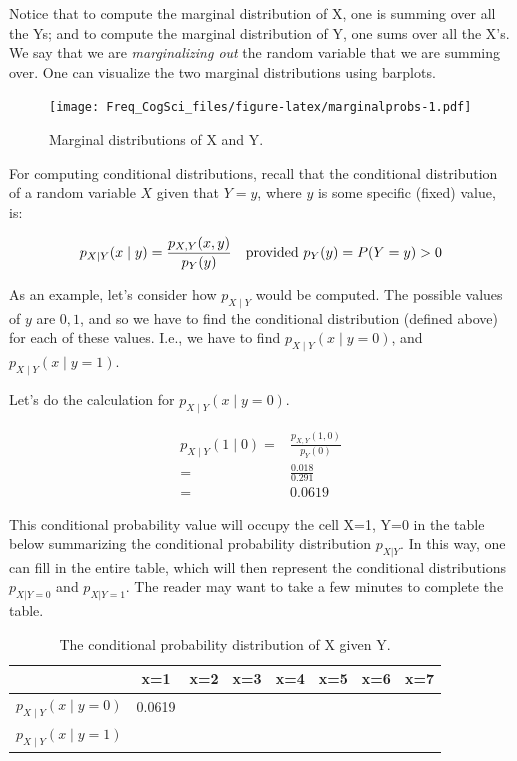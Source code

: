 \documentclass[12pt,]{krantz}
\begin{document}
Notice that to compute the marginal distribution of X, one is summing over all the Ys; and to compute the marginal distribution of Y, one sums over all the X's. We say that we are \emph{marginalizing out} the random variable that we are summing over. One can visualize the two marginal distributions using barplots.

\begin{figure}
\centering
\texttt{[image: Freq\_CogSci\_files/figure-latex/marginalprobs-1.pdf]}
\caption{\label{fig:marginalprobs}Marginal distributions of X and Y.}
\end{figure}

For computing conditional distributions, recall that the conditional distribution of a random variable \(X\) given that \(Y=y\), where \(y\) is some specific (fixed) value, is:

\begin{equation}
p_{X\mid Y} (x\mid y) = \frac{p_{X,Y}(x,y)}{p_Y(y)} \quad \hbox{provided } p_Y(y)=P(Y=y)>0
\end{equation}

As an example, let's consider how \(p_{X\mid Y}\) would be computed.
The possible values of \(y\) are \(0,1\), and so we have to find the conditional distribution (defined above) for each of these values. I.e., we have to find \(p_{X\mid Y}(x\mid y=0)\), and \(p_{X\mid Y}(x\mid y=1)\).

Let's do the calculation for \(p_{X\mid Y}(x\mid y=0)\).

\begin{equation}
\begin{split}
p_{X\mid Y} (1\mid 0) =& \frac{p_{X,Y}(1,0)}{p_Y(0)}\\
    =&  \frac{0.018}{0.291}\\
    =& 0.0619
\end{split} 
\end{equation}

This conditional probability value will occupy the cell X=1, Y=0 in the table below summarizing the conditional probability distribution \(p_{X|Y}\). In this way, one can fill in the entire table, which will then represent the conditional distributions \(p_{X|Y=0}\) and \(p_{X|Y=1}\). The reader may want to take a few minutes to complete the table.

\begin{table}[!htbp]
\begin{center}
\begin{tabular}{c|ccccccc}
    & x=1 & x=2 & x=3 & x=4 & x=5 & x=6 & x=7\\ 
\hline  
$p_{X\mid Y}(x\mid y=0)$  & 0.0619 &  & & & & & \\
$p_{X\mid Y}(x\mid y=1)$  &  &  & & & & &  \\
\end{tabular}
\end{center}
\caption{The conditional probability distribution of X given Y.}
\label{XgivenY}
\end{table}
\end{document}
